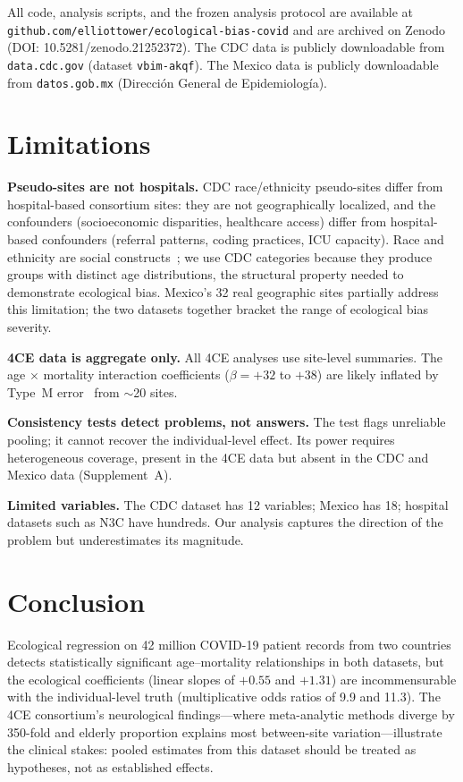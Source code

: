 \documentclass[11pt]{article}
\begin{document}
All code, analysis scripts, and the frozen analysis protocol are
available at
\texttt{github.com/elliottower/ecological-bias-covid}
and are archived on Zenodo (DOI: 10.5281/zenodo.21252372).
The CDC data is publicly downloadable from \texttt{data.cdc.gov} (dataset
\texttt{vbim-akqf}).  The Mexico data is publicly downloadable from
\texttt{datos.gob.mx} (Direcci\'{o}n General de Epidemiolog\'{i}a).


\section{Limitations}

\textbf{Pseudo-sites are not hospitals.}  CDC race/ethnicity pseudo-sites
differ from hospital-based consortium sites: they are not geographically
localized, and the confounders (socioeconomic disparities, healthcare
access) differ from hospital-based confounders (referral patterns, coding
practices, ICU capacity).  Race and ethnicity are social
constructs~\cite{subramanian2009revisiting}; we use CDC categories because
they produce groups with distinct age distributions, the structural property
needed to demonstrate ecological bias.  Mexico's 32 real geographic sites
partially address this limitation; the two datasets together bracket the
range of ecological bias severity.

\textbf{4CE data is aggregate only.}  All 4CE analyses use site-level
summaries.  The age $\times$ mortality interaction coefficients
($\beta = +32$ to $+38$) are likely inflated by Type~M
error~\cite{gelman2014typeMS} from $\sim$20 sites.

\textbf{Consistency tests detect problems, not answers.}  The test flags
unreliable pooling; it cannot recover the individual-level effect.
Its power requires heterogeneous coverage, present in the 4CE data but
absent in the CDC and Mexico data (Supplement~A).

\textbf{Limited variables.}  The CDC dataset has 12 variables; Mexico has
18; hospital datasets such as N3C have hundreds.  Our analysis captures
the direction of the problem but underestimates its magnitude.


\section{Conclusion}

Ecological regression on 42 million COVID-19 patient records from two
countries detects statistically significant age--mortality relationships in
both datasets, but the ecological coefficients (linear slopes of $+0.55$
and $+1.31$) are incommensurable with the individual-level truth
(multiplicative odds ratios of 9.9 and 11.3).  The 4CE consortium's
neurological findings---where meta-analytic methods diverge by 350-fold
and elderly proportion explains most between-site variation---illustrate
the clinical stakes: pooled estimates from this dataset should be treated
as hypotheses, not as established effects.
\end{document}
